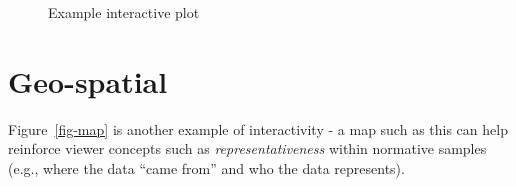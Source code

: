 \documentclass[
  letterpaper,
  DIV=11,
  numbers=noendperiod,
  oneside]{scrreprt}
\begin{document}
\begin{figure}


\caption{\label{fig-plot}Example interactive plot}

\end{figure}%

\section{Geo-spatial}\label{geo-spatial}

Figure~\ref{fig-map} is another example of interactivity - a map such as
this can help reinforce viewer concepts such as
\emph{representativeness} within normative samples (e.g., where the data
``came from'' and who the data represents).
\end{document}
